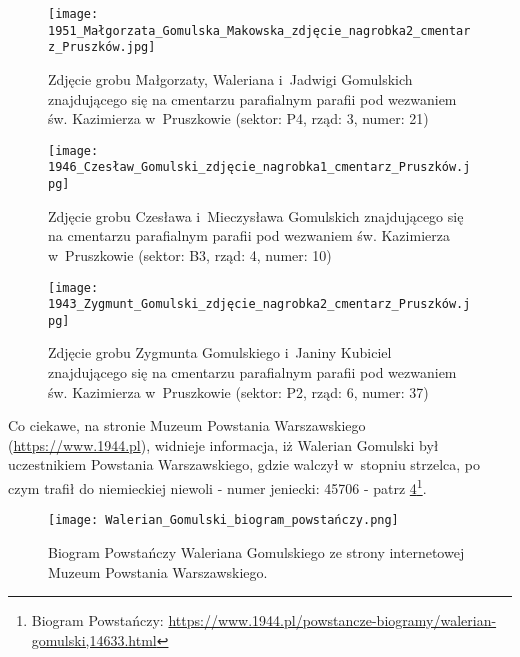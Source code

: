 \begin{figure}[!ht]
    \vspace*{0.4cm}
    \centering \texttt{[image: 
        1951\_Małgorzata\_Gomulska\_Makowska\_zdjęcie\_nagrobka2\_cmentarz\_Pruszków.jpg]}
    \captionsetup{format=hang}
    \caption{Zdjęcie grobu Małgorzaty, Waleriana i~Jadwigi Gomulskich 
    znajdującego się na cmentarzu parafialnym parafii pod wezwaniem św. 
    Kazimierza w~Pruszkowie (sektor: P4, rząd: 3, numer: 21)}
    \label{fig:mgomulska_1951}
\end{figure}

\begin{figure}[!ht]
    \vspace*{0.5cm}
    \centering \texttt{[image: 
        1946\_Czesław\_Gomulski\_zdjęcie\_nagrobka1\_cmentarz\_Pruszków.jpg]}
    \captionsetup{format=hang}
    \caption{Zdjęcie grobu Czesława i~Mieczysława Gomulskich znajdującego się 
    na cmentarzu parafialnym parafii pod wezwaniem św. Kazimierza 
    w~Pruszkowie (sektor: B3, rząd: 4, numer: 10)}
    \label{fig:czgomulski_1946}
\end{figure}

\begin{figure}[!ht]
    \vspace*{0.5cm}
    \centering \texttt{[image: 
        1943\_Zygmunt\_Gomulski\_zdjęcie\_nagrobka2\_cmentarz\_Pruszków.jpg]}
    \captionsetup{format=hang}
    \caption{Zdjęcie grobu Zygmunta Gomulskiego i~Janiny Kubiciel 
    znajdującego się na cmentarzu parafialnym parafii pod wezwaniem św. 
    Kazimierza w~Pruszkowie (sektor: P2, rząd: 6, numer: 37)}
    \label{fig:zgomulski_1943}
\end{figure}

Co ciekawe, na stronie Muzeum Powstania Warszawskiego 
(\url{https://www.1944.pl}), widnieje informacja, iż Walerian Gomulski był 
uczestnikiem Powstania Warszawskiego, gdzie walczył w~stopniu strzelca, po 
czym trafił do niemieckiej niewoli - numer jeniecki: 45706 - patrz 
\ref{fig:wgomulski_biogram}\footnote{Biogram Powstańczy:
\url{https://www.1944.pl/powstancze-biogramy/walerian-gomulski,14633.html}}.

\begin{figure}[!ht]
    \vspace*{0.5cm}
    \centering \texttt{[image: 
        Walerian\_Gomulski\_biogram\_powstańczy.png]}
    \captionsetup{format=hang}
    \caption{Biogram Powstańczy Waleriana Gomulskiego ze strony internetowej
    Muzeum Powstania Warszawskiego.}
    \label{fig:wgomulski_biogram}
\end{figure}

